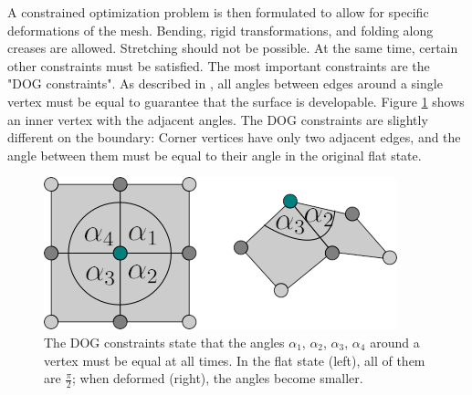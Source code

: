 \documentclass[a4paper,twoside,12pt,nochapterprefix]{scrbook}
\begin{document}
A constrained optimization problem is then formulated to allow for specific deformations of the mesh. Bending, rigid transformations, and folding along creases are allowed. Stretching should not be possible. At the same time, certain other constraints must be satisfied.\newline
The most important constraints are the "DOG constraints". As described in \cite{Rabinovich:DogNets:2018}, all angles between edges around a single vertex must be equal to guarantee that the surface is developable. Figure \ref{fig:dog_constraints} shows an inner vertex with the adjacent angles. The DOG constraints are slightly different on the boundary: Corner vertices have only two adjacent edges, and the angle between them must be equal to their angle in the original flat state.
\begin{figure}
    \centering
    \includegraphics[width=0.4\linewidth]{figures/0322_dogangles}
    \caption{The DOG constraints state that the angles $\alpha_1$, $\alpha_2$, $\alpha_3$, $\alpha_4$ around a vertex must be equal at all times. In the flat state (left), all of them are $\frac{\pi}{2}$; when deformed (right), the angles become smaller.}
    \label{fig:dog_constraints}
\end{figure}
\end{document}
